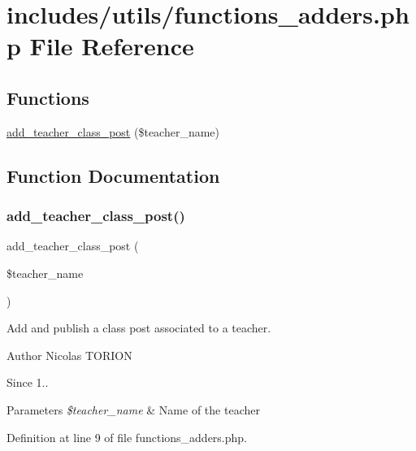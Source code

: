 \hypertarget{functions__adders_8php}{}\section{includes/utils/functions\+\_\+adders.php File Reference}
\label{functions__adders_8php}
\subsection*{Functions}
\begin{DoxyCompactItemize}
\item 
\hyperlink{functions__adders_8php_adf9deb8b767ebf2541aa7aa629bafd0e}{add\+\_\+teacher\+\_\+class\+\_\+post} (\$teacher\+\_\+name)
\end{DoxyCompactItemize}


\subsection{Function Documentation}
\mbox{\label{functions__adders_8php_adf9deb8b767ebf2541aa7aa629bafd0e}} 
\subsubsection{\texorpdfstring{add\+\_\+teacher\+\_\+class\+\_\+post()}{add\_teacher\_class\_post()}}
{\footnotesize\ttfamily add\+\_\+teacher\+\_\+class\+\_\+post (\begin{DoxyParamCaption}\item[{}]{\$teacher\+\_\+name }\end{DoxyParamCaption})}

Add and publish a class post associated to a teacher.

\begin{DoxyAuthor}{Author}
Nicolas T\+O\+R\+I\+ON 
\end{DoxyAuthor}
\begin{DoxySince}{Since}
1.. 
\end{DoxySince}

\begin{DoxyParams}{Parameters}
{\em \$teacher\+\_\+name} & Name of the teacher \\
\hline
\end{DoxyParams}


Definition at line 9 of file functions\+\_\+adders.\+php.

